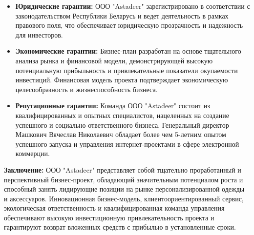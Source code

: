 \begin{itemize}
    \item \textbf{Юридические гарантии:}  ООО "Astadeer" зарегистрировано в соответствии с законодательством Республики Беларусь и ведет деятельность в рамках правового поля, что обеспечивает юридическую прозрачность и надежность для инвесторов.
    \item \textbf{Экономические гарантии:}  Бизнес-план разработан на основе тщательного анализа рынка и финансовой модели, демонстрирующей высокую потенциальную прибыльность и привлекательные показатели окупаемости инвестиций.  Финансовая модель проекта подтверждает экономическую целесообразность и жизнеспособность бизнеса.
    \item \textbf{Репутационные гарантии:}  Команда ООО "Astadeer" состоит из квалифицированных и опытных специалистов, нацеленных на создание успешного и социально-ответственного бизнеса.  Генеральный директор Машкович Вячеслав Николаевич обладает более чем 5-летним опытом успешного запуска и управления интернет-проектами в сфере электронной коммерции.
\end{itemize}

\vspace{0.5cm}

\textbf{Заключение:}  ООО "Astadeer" представляет собой тщательно проработанный и перспективный бизнес-проект, обладающий значительным потенциалом роста и способный занять лидирующие позиции на рынке персонализированной одежды и аксессуаров.  Инновационная бизнес-модель, клиентоориентированный сервис, экологическая ответственность и квалифицированная команда управления обеспечивают высокую инвестиционную привлекательность проекта и гарантируют возврат вложенных средств с прибылью в установленные сроки.

